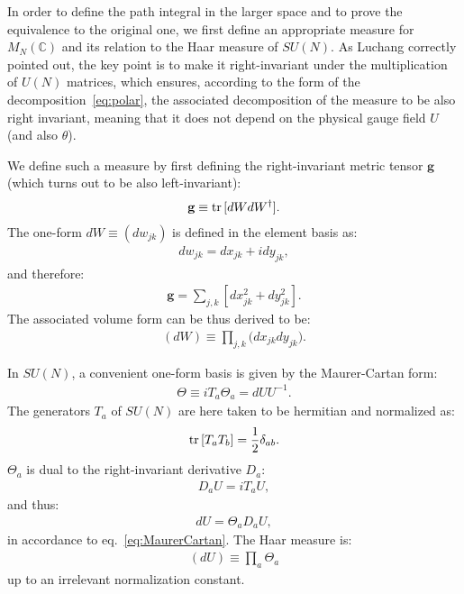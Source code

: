 \documentclass[12pt]{article}
\begin{document}
In order to define the path integral in the larger space
and to prove the equivalence to the original one,
we first define an appropriate measure for $M_N(\mathbb{C})$
and its relation to the Haar measure of $SU(N)$.
As Luchang correctly pointed out,
the key point is to make it right-invariant under
the multiplication of $U(N)$ matrices,
which ensures, according to the form of the decomposition~\eqref{eq:polar},
the associated decomposition of the measure to be also right invariant,
meaning that it does not depend on the physical gauge field $U$
(and also $\theta$).

We define such a measure by
first defining the right-invariant metric tensor $\textbf{g}$
(which turns out to be also left-invariant):
\begin{align}
  \textbf{g}
  \equiv
  {\rm tr}\, [dW dW^\dagger].
\end{align}
The one-form $dW\equiv (dw_{jk})$ is defined in the element basis as:
\begin{align}
  dw_{jk} = dx_{jk} + i dy_{jk},
\end{align}
and therefore:
\begin{align}
  \textbf{g}
  =
  \sum_{j,k}[dx_{jk}^2 + dy_{jk}^2].
\end{align}
The associated volume form can be thus derived to be:
\begin{align}
  (dW)
  \equiv
  \prod_{j,k}
  \big(
  dx_{jk} dy_{jk}
  \big).
  \label{eq:measure_flat}
\end{align}

In $SU(N)$, a convenient one-form basis
is given by the Maurer-Cartan form:
\begin{align}
  \Theta \equiv i T_a \Theta_a = dU U^{-1}. \label{eq:MaurerCartan}
\end{align}
The generators $T_a$ of $SU(N)$ are here taken to be hermitian and normalized as:
\begin{align}
  {\rm tr}\,[T_a T_b] = \frac{1}{2} \delta_{ab}.
\end{align}
$\Theta_a$ is dual to the right-invariant derivative $D_a$:
\begin{align}
  D_a U = i T_a U,
\end{align}
and thus:
\begin{align}
  dU = \Theta_a D_a U,
\end{align}
in accordance to eq.~\eqref{eq:MaurerCartan}.
The Haar measure is:
\begin{align}
  (dU) \equiv \prod_a \Theta_a
\end{align}
up to an irrelevant normalization constant.
\end{document}

